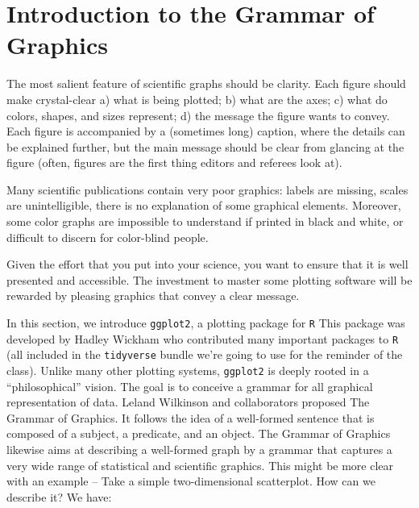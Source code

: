 \documentclass[
  letterpaper,
  DIV=11,
  numbers=noendperiod]{scrreprt}
\begin{document}
\hypertarget{introduction-to-the-grammar-of-graphics}{%
\section{Introduction to the Grammar of
Graphics}\label{introduction-to-the-grammar-of-graphics}}

The most salient feature of scientific graphs should be clarity. Each
figure should make crystal-clear a) what is being plotted; b) what are
the axes; c) what do colors, shapes, and sizes represent; d) the message
the figure wants to convey. Each figure is accompanied by a (sometimes
long) caption, where the details can be explained further, but the main
message should be clear from glancing at the figure (often, figures are
the first thing editors and referees look at).

Many scientific publications contain very poor graphics: labels are
missing, scales are unintelligible, there is no explanation of some
graphical elements. Moreover, some color graphs are impossible to
understand if printed in black and white, or difficult to discern for
color-blind people.

Given the effort that you put into your science, you want to ensure that
it is well presented and accessible. The investment to master some
plotting software will be rewarded by pleasing graphics that convey a
clear message.

In this section, we introduce \texttt{ggplot2}, a plotting package for
\texttt{R} This package was developed by Hadley Wickham who contributed
many important packages to \texttt{R} (all included in the
\texttt{tidyverse} bundle we're going to use for the reminder of the
class). Unlike many other plotting systems, \texttt{ggplot2} is deeply
rooted in a ``philosophical'' vision. The goal is to conceive a grammar
for all graphical representation of data. Leland Wilkinson and
collaborators proposed The Grammar of Graphics. It follows the idea of a
well-formed sentence that is composed of a subject, a predicate, and an
object. The Grammar of Graphics likewise aims at describing a
well-formed graph by a grammar that captures a very wide range of
statistical and scientific graphics. This might be more clear with an
example -- Take a simple two-dimensional scatterplot. How can we
describe it? We have:
\end{document}
